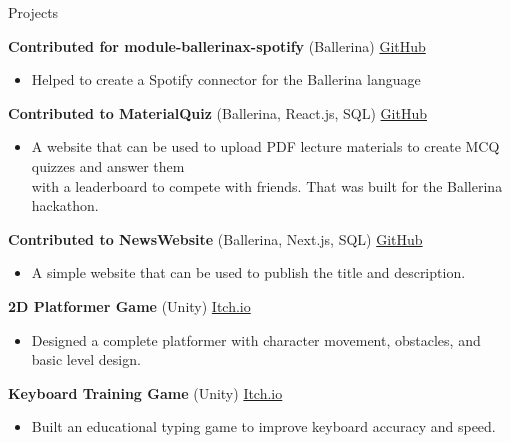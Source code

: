 \documentclass{resume} %
\begin{document}
\begin{rSection}{Projects}
\vspace{-1.25em}

\item \textbf{Contributed for module-ballerinax-spotify} (Ballerina) \hfill \href{https://github.com/ballerina-platform/module-ballerinax-spotify}{GitHub}
\begin{itemize}
    \itemsep -3pt {} 
    \item Helped to create a Spotify connector for the Ballerina language 
\end{itemize}

\item \textbf{Contributed to MaterialQuiz } (Ballerina, React.js, SQL) \hfill \href{https://github.com/Sachindu-Nethmin/iwb25-197-integrators}{GitHub}
\begin{itemize}
    \itemsep -3pt {} 
    \item A website that can be used to upload PDF lecture materials to create MCQ quizzes and answer them \\with a leaderboard to compete with friends. That was built for the Ballerina hackathon.
\end{itemize}

\item \textbf{Contributed to NewsWebsite } (Ballerina, Next.js, SQL) \hfill \href{https://github.com/Sachindu-Nethmin/news-website-ballerina}{GitHub}
\begin{itemize}
    \itemsep -3pt {} 
    \item A simple website that can be used to publish the title and description.
\end{itemize}

\item \textbf{2D Platformer Game} (Unity) \hfill \href{https://sachindu-nethmin.itch.io/grow-in-the-dark}{Itch.io}
\begin{itemize}
    \itemsep -3pt {} 
    \item Designed a complete platformer with character movement, obstacles, and basic level design.
\end{itemize}

\item \textbf{Keyboard Training Game} (Unity) \hfill \href{https://sachindu-nethmin.itch.io/trigger}{Itch.io}
\begin{itemize}
    \itemsep -3pt {}
    \item Built an educational typing game to improve keyboard accuracy and speed.
\end{itemize}


\end{rSection}
\end{document}
